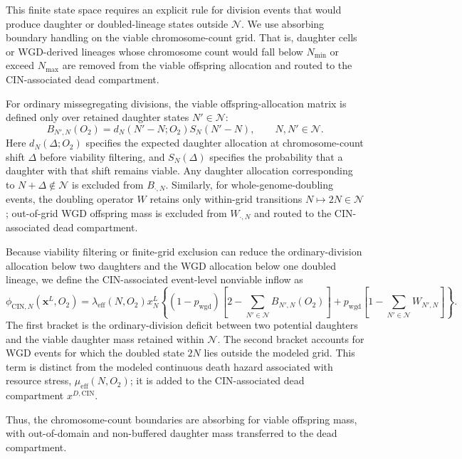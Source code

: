 \documentclass[11pt]{article}
\begin{document}
This finite state space requires an explicit rule for division events that would produce daughter or doubled-lineage states outside $\mathcal{N}$. We use absorbing boundary handling on the viable chromosome-count grid. That is, daughter cells or WGD-derived lineages whose chromosome count would fall below $N_{\min}$ or exceed $N_{\max}$ are removed from the viable offspring allocation and routed to the CIN-associated dead compartment.

For ordinary missegregating divisions, the viable offspring-allocation matrix is defined only over retained daughter states $N'\in\mathcal{N}$:
\[
B_{N',N}(O_2) = d_N(N'-N;O_2)S_N(N'-N), \qquad N,N'\in\mathcal{N}.
\]
Here $d_N(\Delta;O_2)$ specifies the expected daughter allocation at chromosome-count shift $\Delta$ before viability filtering, and $S_N(\Delta)$ specifies the probability that a daughter with that shift remains viable. Any daughter allocation corresponding to $N+\Delta\notin\mathcal{N}$ is excluded from $B_{\cdot,N}$. Similarly, for whole-genome-doubling events, the doubling operator $W$ retains only within-grid transitions $N\mapsto 2N\in\mathcal{N}$; out-of-grid WGD offspring mass is excluded from $W_{\cdot,N}$ and routed to the CIN-associated dead compartment.


Because viability filtering or finite-grid exclusion can reduce the ordinary-division allocation below two daughters and the WGD allocation below one doubled lineage, we define the CIN-associated event-level nonviable inflow as
\begin{equation}
\phi_{\mathrm{CIN},N}(\mathbf{x}^L,O_2) = \lambda_{\mathrm{eff}}(N,O_2)x^L_N
\left\{
(1-p_{\mathrm{wgd}})
\left[
2-\sum_{N'\in\mathcal{N}}B_{N',N}(O_2)
\right]
+
p_{\mathrm{wgd}}
\left[
1-\sum_{N'\in\mathcal{N}}W_{N',N}
\right]
\right\}.
\label{eq:appendix_phi_CIN}
\end{equation}
The first bracket is the ordinary-division deficit between two potential daughters and the viable daughter mass retained within $\mathcal{N}$. The second bracket accounts for WGD events for which the doubled state $2N$ lies outside the modeled grid. This term is distinct from the modeled continuous death hazard associated with resource stress, $\mu_{\mathrm{eff}}(N,O_2)$; it is added to the CIN-associated dead compartment $x^{D,\mathrm{CIN}}$.

Thus, the chromosome-count boundaries are absorbing for viable offspring mass, with out-of-domain and non-buffered daughter mass transferred to the dead compartment.
\end{document}
